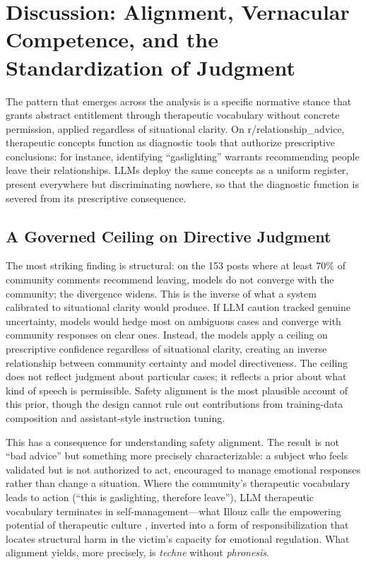 \section{Discussion: Alignment, Vernacular Competence, and the Standardization of Judgment}
\label{sec:discussion}

The pattern that emerges across the analysis is a specific normative stance that grants abstract entitlement through therapeutic vocabulary without concrete permission, applied regardless of situational clarity. On r/relationship\_advice, therapeutic concepts function as diagnostic tools that authorize prescriptive conclusions: for instance, identifying ``gaslighting'' warrants recommending people leave their relationships. LLMs deploy the same concepts as a uniform register, present everywhere but discriminating nowhere, so that the diagnostic function is severed from its prescriptive consequence.

\subsection{A Governed Ceiling on Directive Judgment}

The most striking finding is structural: on the 153 posts where at least 70\% of community comments recommend leaving, models do not converge with the community; the divergence widens. This is the inverse of what a system calibrated to situational clarity would produce. If LLM caution tracked genuine uncertainty, models would hedge most on ambiguous cases and converge with community responses on clear ones. Instead, the models apply a ceiling on prescriptive confidence regardless of situational clarity, creating an inverse relationship between community certainty and model directiveness. The ceiling does not reflect judgment about particular cases; it reflects a prior about what kind of speech is permissible. Safety alignment is the most plausible account of this prior, though the design cannot rule out contributions from training-data composition and assistant-style instruction tuning.

This has a consequence for understanding safety alignment. The result is not ``bad advice'' but something more precisely characterizable: a
subject who feels validated but is not authorized to act, encouraged to manage emotional responses rather than change a situation. Where the community's therapeutic vocabulary leads to action (``this is 
gaslighting, therefore leave''), LLM therapeutic vocabulary terminates in self-management---what Illouz calls the empowering potential of therapeutic culture \citep{illouz2008saving}, inverted into a form of 
responsibilization that locates structural harm in the victim's capacity for emotional regulation. What alignment yields, more precisely, is \emph{techne} without \emph{phronesis}. 

